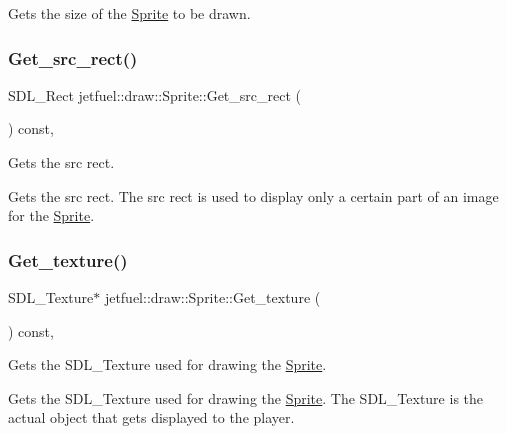 Gets the size of the \hyperlink{classjetfuel_1_1draw_1_1Sprite}{Sprite} to be drawn. \mbox{\label{classjetfuel_1_1draw_1_1Sprite_ab3e7bda170f41633ec80408b639286db}} 
\subsubsection{\texorpdfstring{Get\+\_\+src\+\_\+rect()}{Get\_src\_rect()}}
{\footnotesize\ttfamily S\+D\+L\+\_\+\+Rect jetfuel\+::draw\+::\+Sprite\+::\+Get\+\_\+src\+\_\+rect (\begin{DoxyParamCaption}{ }\end{DoxyParamCaption}) const\hspace{0.3cm}{\ttfamily [inline]}, {\ttfamily [protected]}}



Gets the src rect. 

Gets the src rect. The src rect is used to display only a certain part of an image for the \hyperlink{classjetfuel_1_1draw_1_1Sprite}{Sprite}. \mbox{\label{classjetfuel_1_1draw_1_1Sprite_ad2d60845bf4e9915b162b07e0d96bf76}} 
\subsubsection{\texorpdfstring{Get\+\_\+texture()}{Get\_texture()}}
{\footnotesize\ttfamily S\+D\+L\+\_\+\+Texture$\ast$ jetfuel\+::draw\+::\+Sprite\+::\+Get\+\_\+texture (\begin{DoxyParamCaption}{ }\end{DoxyParamCaption}) const\hspace{0.3cm}{\ttfamily [inline]}, {\ttfamily [protected]}}



Gets the S\+D\+L\+\_\+\+Texture used for drawing the \hyperlink{classjetfuel_1_1draw_1_1Sprite}{Sprite}. 

Gets the S\+D\+L\+\_\+\+Texture used for drawing the \hyperlink{classjetfuel_1_1draw_1_1Sprite}{Sprite}. The S\+D\+L\+\_\+\+Texture is the actual object that gets displayed to the player. \mbox{\label{classjetfuel_1_1draw_1_1Sprite_a31b6b5ee62f3298577bbf78ad7b18cdf}} 
